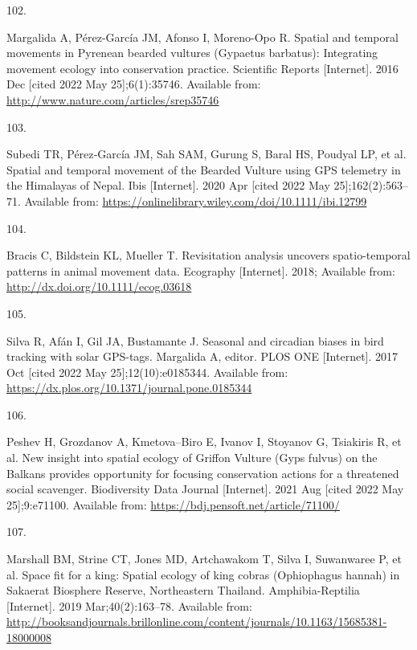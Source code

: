 \documentclass[10pt,a4paper]{article}
\newlength{\cslhangindent}
\newlength{\csllabelwidth}
\newenvironment{CSLReferences}[2] %
{\begin{list}{}{%
	\setlength{\itemindent}{0pt}
	\setlength{\leftmargin}{0pt}
	\setlength{\parsep}{0pt}
	\ifodd #1
	\setlength{\leftmargin}{\cslhangindent}
	\setlength{\itemindent}{-1\cslhangindent}
	\fi
	\setlength{\itemsep}{#2\baselineskip}}}
{\end{list}}
\newcommand{\CSLLeftMargin}[1]{\parbox[t]{\csllabelwidth}{\strut#1\strut}}
\newcommand{\CSLRightInline}[1]{\parbox[t]{\linewidth - \csllabelwidth}{\strut#1\strut}}
\begin{document}
\begin{CSLReferences}{0}{1}
\CSLLeftMargin{102. }%
\CSLRightInline{Margalida A, Pérez-García JM, Afonso I, Moreno-Opo R. Spatial and temporal movements in {Pyrenean} bearded vultures ({Gypaetus} barbatus): {Integrating} movement ecology into conservation practice. Scientific Reports {[}Internet{]}. 2016 Dec {[}cited 2022 May 25{]};6(1):35746. Available from: \url{http://www.nature.com/articles/srep35746}}

\CSLLeftMargin{103. }%
\CSLRightInline{Subedi TR, Pérez‐García JM, Sah SAM, Gurung S, Baral HS, Poudyal LP, et al. Spatial and temporal movement of the {Bearded} {Vulture} using {GPS} telemetry in the {Himalayas} of {Nepal}. Ibis {[}Internet{]}. 2020 Apr {[}cited 2022 May 25{]};162(2):563--71. Available from: \url{https://onlinelibrary.wiley.com/doi/10.1111/ibi.12799}}

\CSLLeftMargin{104. }%
\CSLRightInline{Bracis C, Bildstein KL, Mueller T. Revisitation analysis uncovers spatio-temporal patterns in animal movement data. Ecography {[}Internet{]}. 2018; Available from: \url{http://dx.doi.org/10.1111/ecog.03618}}

\CSLLeftMargin{105. }%
\CSLRightInline{Silva R, Afán I, Gil JA, Bustamante J. Seasonal and circadian biases in bird tracking with solar {GPS}-tags. Margalida A, editor. PLOS ONE {[}Internet{]}. 2017 Oct {[}cited 2022 May 25{]};12(10):e0185344. Available from: \url{https://dx.plos.org/10.1371/journal.pone.0185344}}

\CSLLeftMargin{106. }%
\CSLRightInline{Peshev H, Grozdanov A, Kmetova--Biro E, Ivanov I, Stoyanov G, Tsiakiris R, et al. New insight into spatial ecology of {Griffon} {Vulture} ({Gyps} fulvus) on the {Balkans} provides opportunity for focusing conservation actions for a threatened social scavenger. Biodiversity Data Journal {[}Internet{]}. 2021 Aug {[}cited 2022 May 25{]};9:e71100. Available from: \url{https://bdj.pensoft.net/article/71100/}}

\CSLLeftMargin{107. }%
\CSLRightInline{Marshall BM, Strine CT, Jones MD, Artchawakom T, Silva I, Suwanwaree P, et al. Space fit for a king: Spatial ecology of king cobras ({Ophiophagus} hannah) in {Sakaerat} {Biosphere} {Reserve}, {Northeastern} {Thailand}. Amphibia-Reptilia {[}Internet{]}. 2019 Mar;40(2):163--78. Available from: \url{http://booksandjournals.brillonline.com/content/journals/10.1163/15685381-18000008}}


\end{CSLReferences}
\end{document}
